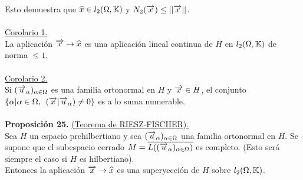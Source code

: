 Esto demuestra que $\widehat{x} \in l_2 (\Omega,\mathbb{K})$ y $N_2 (\overrightarrow{x}) \leq || \overrightarrow{x} ||$. \\ \\
 \underline{Corolario 1.} \\
 La aplicación $\overrightarrow{x} \rightarrow \widehat{x}$ es una aplicación lineal continua de $H$ en $l_2 (\Omega,\mathbb{K})$ de norma $ \leq 1$. \\ \\
 \underline{Corolario 2.}\\
 Si $(\overrightarrow{u}_\alpha)_{\alpha \in \Omega}$ es una familia ortonormal en $H$ y $\overrightarrow{x} \in H$, el conjunto $\lbrace \alpha | \alpha \in \Omega, \phantom{s} (\overrightarrow{x} | \overrightarrow{u}_\alpha)\neq 0 \rbrace$ es a lo suma numerable. \\ \\
 \textbf{Proposición 25.} \underline{(Teorema de RIESZ-FISCHER).}\\
 Sea $H$ un espacio prehilbertiano y sea $(\overrightarrow{u}_\alpha)_{\alpha \in \Omega}$ una familia ortonormal en $H$. Se supone que el subespacio cerrado $M=\overline{L ((\overrightarrow{u}_\alpha)_{\alpha \in \Omega})}$ es completo. (Esto será siempre el caso si $H$ es hilbertiano). \\
 Entonces la aplicación $\overrightarrow{x} \rightarrow \widehat{x}$ es una superyección de $H$ sobre $l_2 (\Omega,\mathbb{K})$.\\
 
